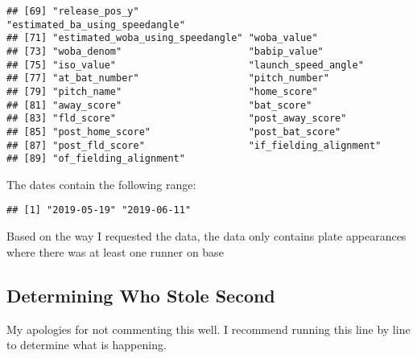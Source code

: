 \documentclass[]{article}
\newenvironment{Shaded}{\begin{snugshade}}{\end{snugshade}}
\newcommand{\KeywordTok}[1]{\textcolor[rgb]{0.13,0.29,0.53}{\textbf{#1}}}
\newcommand{\StringTok}[1]{\textcolor[rgb]{0.31,0.60,0.02}{#1}}
\newcommand{\OperatorTok}[1]{\textcolor[rgb]{0.81,0.36,0.00}{\textbf{#1}}}
\newcommand{\NormalTok}[1]{#1}
\begin{document}
\begin{verbatim}
## [69] "release_pos_y"                   "estimated_ba_using_speedangle"  
## [71] "estimated_woba_using_speedangle" "woba_value"                     
## [73] "woba_denom"                      "babip_value"                    
## [75] "iso_value"                       "launch_speed_angle"             
## [77] "at_bat_number"                   "pitch_number"                   
## [79] "pitch_name"                      "home_score"                     
## [81] "away_score"                      "bat_score"                      
## [83] "fld_score"                       "post_away_score"                
## [85] "post_home_score"                 "post_bat_score"                 
## [87] "post_fld_score"                  "if_fielding_alignment"          
## [89] "of_fielding_alignment"
\end{verbatim}

The dates contain the following range:

\begin{Shaded}
\end{Shaded}

\begin{verbatim}
## [1] "2019-05-19" "2019-06-11"
\end{verbatim}

Based on the way I requested the data, the data only contains plate
appearances where there was at least one runner on base

\subsection{Determining Who Stole
Second}\label{determining-who-stole-second}

My apologies for not commenting this well. I recommend running this line
by line to determine what is happening.
\end{document}
